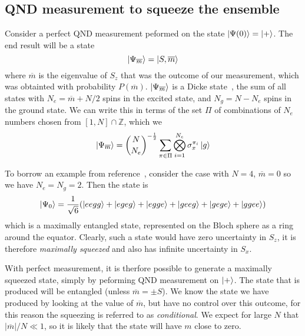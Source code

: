 \documentclass{article}
\newcommand*\meas[1]{\overline{#1}}
\begin{document}
\subsection{QND measurement to squeeze the ensemble}



Consider a perfect QND measurement peformed on the state $\ket{\Psi(0)} =
\ket{+}$. The end result will be a state
%
\begin{equation}
  \ket{\Psi_{\meas{m}}} = \ket{S, \meas{m}}
\end{equation}
%
where $\meas{m}$ is the eigenvalue of $S_z$ that was the outcome of our
measurement, which was obtainted with probability $P(\meas{m})$.
$\ket{\Psi_{\meas{m}}}$ is a Dicke state~\cite{Baertschi2019}, the sum of all
states with $N_e = \meas{m} + N/2$ spins in the excited state, and $N_g = N -
N_e$ spins in the ground state.  We can write this in terms of the set $\Pi$ of
combinations of $N_e$ numbers chosen from $[1,N]\cap\mathbb{Z}$, which we
%
\begin{equation}
  \ket{\Psi_{\meas{m}}} = {N \choose N_e}^{-\frac{1}{2}}\sum_{\pi \in \Pi}
  \bigotimes_{i=1}^{N_e} \sigma_x^{\pi_i} \ket{g}
\end{equation}

To borrow an example from
reference~\cite{Cox2016}, consider the case with $N=4$, $\meas{m}=0$ so we have
$N_e = N_g = 2$. Then the state is
%
\begin{equation}
  \ket{\Psi_0} = \frac{1}{\sqrt{6}}(\ket{eegg} + \ket{egeg} + \ket{egge} +
  \ket{geeg} + \ket{gege} + \ket{ggee})
\end{equation}
%
which is a maximally entangled state, represented on the Bloch sphere as a ring
around the equator.
%
Clearly, such a state would have zero uncertainty in $S_z$, it is therefore
\emph{maximally squeezed}
and also has infinite uncertainty in $S_x$.

With perfect measurement, it is therfore possible to generate a maximally
squeezed state, simply by peforming QND measurement on  $\ket{+}$. The state
that is produced will be entangled (unless $\meas{m} = \pm S$). We know the
state we have produced by looking at the value of $\meas{m}$, but have no
control over this outcome, for this reason the squeezing is referred to as
\emph{conditional}.
%
We expect for large $N$ that $|\meas{m}|/N \ll 1$, so it is likely that the
state will have $m$ close to zero.
\end{document}
